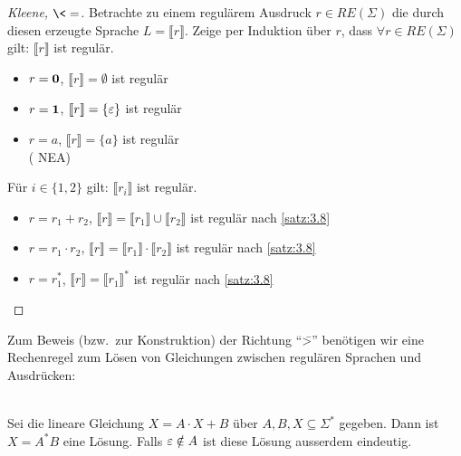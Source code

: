 {\begin{proof}[Kleene, $\<=$]
Betrachte zu einem regulärem Ausdruck $r\in RE(\Sigma)$ die durch diesen erzeugte Sprache $L=\llbracket r \rrbracket$. Zeige per Induktion über $r$, dass $ \forall r\in RE(\Sigma) $ gilt: $ \llbracket r \rrbracket$ ist regulär.
    	\begin{description}[font=\normalfont]
      \item[I.A.:] \hfill
        \vspace{-\baselineskip}
        \begin{itemize}
        \item $r = \mathbf{0}$, $\llbracket r \rrbracket = \emptyset$ ist regulär
        \item $r = \mathbf{1}$, $\llbracket r \rrbracket = \{ \varepsilon \}$ ist regulär
        \item $r = a$, $\llbracket r \rrbracket = \{ a \}$ ist regulär \\
          (
    			 \quad\acs{NEA}) 
        \end{itemize}
        \item[I.V.:] Für $i \in \{1, 2\}$ gilt: $\llbracket r_i \rrbracket$ ist regulär.
    		\item[I.S.:] \hfill
          \vspace{-\baselineskip}
          \begin{itemize}
          \item $r = r_1 + r_2$, $\llbracket r \rrbracket = \llbracket r_1 \rrbracket \cup \llbracket r_2 \rrbracket$ ist regulär nach \autoref{satz:3.8}
          \item $r = r_1 \cdot r_2$, $\llbracket r \rrbracket = \llbracket r_1 \rrbracket \cdot \llbracket r_2 \rrbracket$ ist regulär nach \autoref{satz:3.8}
          \item $r = r_1^*$, $\llbracket r \rrbracket = \llbracket r_1 \rrbracket^*$ ist regulär nach \autoref{satz:3.8}
          \end{itemize}
		\end{description}
\end{proof}

Zum Beweis (bzw.\ zur Konstruktion) der Richtung "`\=>"' benötigen wir eine Rechenregel zum Lösen von Gleichungen zwischen regulären Sprachen und Ausdrücken:
\begin{lemma}\label{lem:arden}\ \\
        Sei die lineare Gleichung $X=A\cdot X+B$ über $A, B, X\subseteq \Sigma^*$ gegeben. Dann ist $X=A^*B$ eine Lösung. Falls $\varepsilon \notin A$ ist diese Lösung ausserdem eindeutig.
\end{lemma}

}
